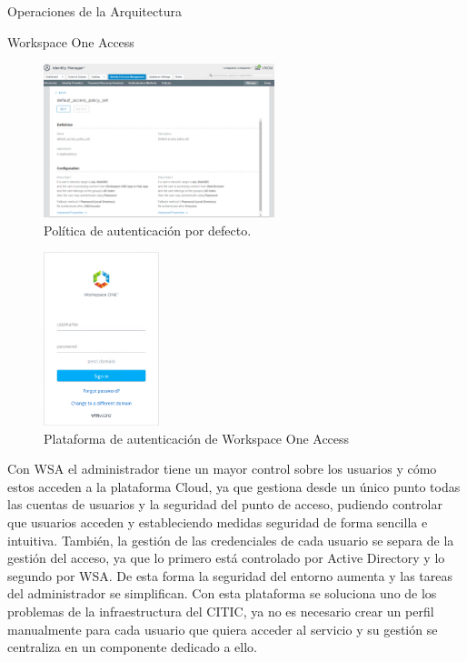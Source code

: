 \begin{subsection}{Operaciones de la Arquitectura}
\begin{subsubsection}{Workspace One Access}
        \begin{figure}[h]
            \centering
            \includegraphics[width=0.6\textwidth]{imaxes/pruebaconcepto/vrealize/default-policy.png}
            \caption{Política de autenticación por defecto.}
            \label{fig:default-policy}
        \end{figure}
        \FloatBarrier
        
        \begin{figure}[h]
            \centering
            \includegraphics[width=0.3\textwidth]{imaxes/pruebaconcepto/vrealize/wsa-login.png}
            \caption{Plataforma de autenticación de Workspace One Access}
            \label{fig:wsa-platform}
        \end{figure}
        \FloatBarrier        
        Con WSA el administrador tiene un mayor control sobre los usuarios y cómo estos acceden a la plataforma Cloud, ya que gestiona desde un único punto todas las cuentas de usuarios y la seguridad del punto de acceso, pudiendo controlar que usuarios acceden y estableciendo medidas seguridad de forma sencilla e intuitiva. También, la gestión de las credenciales de cada usuario se separa de la gestión del acceso, ya que lo primero está controlado por Active Directory y lo segundo por WSA. De esta forma la seguridad del entorno aumenta y las tareas del administrador se simplifican. Con esta plataforma se soluciona uno de los problemas de la infraestructura del CITIC, ya no es necesario crear un perfil manualmente para cada usuario que quiera acceder al servicio y su gestión se centraliza en un componente dedicado a ello.


\end{subsubsection}
\end{subsection}
